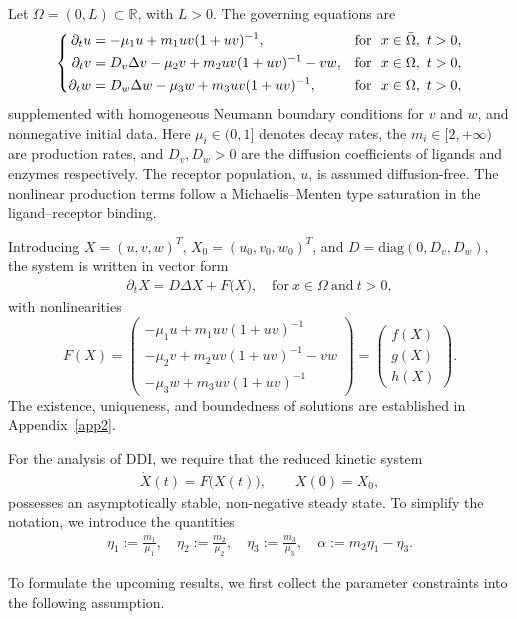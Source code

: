 \documentclass[12pt, a4paper]{amsart}
\numberwithin{equation}{section}
\newcommand{\diag}{\mathrm{diag}}
\def\mf{\mu_1}
\def\ml{\mu_2}
\def\me{\mu_3}
\def\be{\begin{equation}}
\def\ee{\end{equation}}
\def\bpm{\begin{pmatrix}}
\def\epm{\end{pmatrix}}
\def\del{\partial}
\begin{document}
Let $\Omega = (0,L)\subset\mathbb{R}$, with $L>0$. The governing equations are
\be \label{eq:toysys}
\left\{
\begin{aligned}
    \del_t u &= -\mu_1 u + m_1 uv (1 + u v)^{-1}, & \textup{for } \ x \in \bar\Omega, \ t > 0,\\
    \del_t v &= D_v \Delta v -\mu_2 v + m_2 uv (1 + uv)^{-1} - vw, & \textup{for } \ x \in \Omega, \ t > 0,\\
    \del_t w &= D_w \Delta w -\mu_3 w + m_3 uv (1 + uv)^{-1}, & \textup{for } \ x \in \Omega, \ t > 0,
\end{aligned}
\right.
\ee
supplemented with homogeneous Neumann boundary conditions for $v$ and $w$, and nonnegative initial data.
Here $\mu_i \in (0,1]$ denotes decay rates, the $m_i \in [2,+\infty)$ are production rates, and $D_v, D_w > 0$ are the diffusion coefficients of ligands and enzymes respectively. The receptor population, $u$, is assumed diffusion-free.
The nonlinear production terms follow a Michaelis--Menten type saturation in the ligand--receptor binding.


Introducing $X = \left(u, v, w \right)^T$, $X_0 = \left(u_0, v_0, w_0 \right)^T$, and $D = \diag(0, D_v, D_w)$, the system is written in vector form
\begin{align}
\del_t X = D \Delta X + F \bigl( X \bigr), \quad \text{for} \ x \in \Omega \ \text{and} \ t > 0, 
\end{align}
with nonlinearities
\[F(X)  = \bpm -\mu_1 u + m_1 uv (1 + uv)^{-1} \\ -\mu_2 v + m_2 uv (1 + uv)^{-1} - vw \\ -\mu_3 w + m_3 uv (1 + uv)^{-1}\epm = \bpm f(X) \\ g(X) \\ h(X) \epm. \]
The existence, uniqueness, and boundedness of solutions are established in Appendix~\ref{app2}.

For the analysis of DDI, we require that the reduced kinetic system
\begin{align}
    \dot{ X}(t) = F \bigl( X(t) \bigr), \qquad X(0) = X_0,
\end{align}
possesses an asymptotically stable, non-negative steady state. 
To simplify the notation, we introduce the quantities
\begin{align}
\label{eq:EtaDef}
\eta_1 := \frac{m_1}{\mf}, \quad \eta_2 := \frac{m_2}{\ml}, \quad \eta_3 := \frac{m_3}{\me}, \quad \alpha := m_2 \eta_1 - \eta_3.
\end{align}

To formulate the upcoming results, we first collect the parameter constraints into the following assumption.
\end{document}
